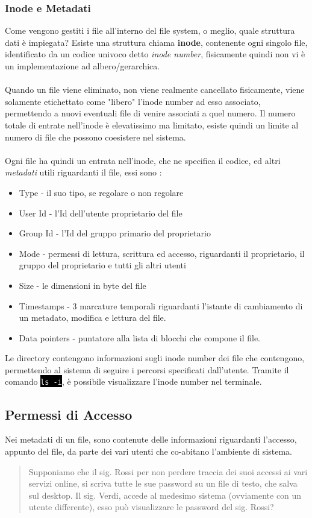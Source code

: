 \documentclass[12pt, letterpaper]{article}
\newcommand{\shelll}[1]{\colorbox{black}{\textcolor{white}{\texttt{#1}}}}
\newcommand{\acc}{\\\hphantom{}\\}
\begin{document}
 \subsubsection{Inode e Metadati}
 Come vengono gestiti i file all'interno del file system, o meglio, quale struttura dati è impiegata? Esiste una struttura chiama 
 \textbf{inode}, contenente ogni singolo file, identificato da un codice univoco detto \textit{inode number}, fisicamente quindi 
 non vi è un implementazione ad albero/gerarchica.\acc 
 Quando un file viene eliminato, non viene realmente cancellato fisicamente, viene solamente etichettato come "libero" l'inode 
 number ad esso associato, permettendo a nuovi eventuali file di venire associati a quel numero. Il numero totale di entrate 
 nell'inode è elevatissimo ma limitato, esiste quindi un limite al numero di file che possono coesistere nel sistema.\acc 
 Ogni file ha quindi un entrata nell'inode, che ne specifica il codice, ed altri \textit{metadati} utili riguardanti il file, 
 essi sono : \begin{itemize}
    \item Type - il suo tipo, se regolare o non regolare 
    \item User Id - l'Id dell'utente proprietario del file 
    \item Group Id - l'Id del gruppo primario del proprietario 
    \item Mode - permessi di lettura, scrittura ed accesso, riguardanti il proprietario, il gruppo del proprietario e 
    tutti gli altri  utenti
    \item Size - le dimensioni in byte del file 
    \item Timestamps - 3 marcature temporali riguardanti l'istante di cambiamento di un metadato, modifica e lettura del file.
    \item Data pointers - puntatore alla lista di blocchi che compone il file.
 \end{itemize} 
 Le directory contengono informazioni sugli inode number dei file che contengono, permettendo al sistema di seguire i percorsi 
 specificati dall'utente. Tramite il comando \shelll{ls -i},  è possibile visualizzare 
 l'inode number  nel terminale.\subsection{Permessi di Accesso}
 Nei metadati di un file, sono contenute delle informazioni riguardanti l'accesso, appunto del file, da parte dei vari utenti 
 che co-abitano l'ambiente di sistema. \begin{quote}
Supponiamo che il sig. Rossi per non perdere traccia dei suoi accessi ai vari servizi 
 online, si scriva tutte le sue password su un file di testo, che salva sul desktop. Il sig. Verdi, accede al medesimo sistema 
 (ovviamente con un utente differente), esso può visualizzare le password del sig. Rossi?    
\end{quote}
\end{document}
